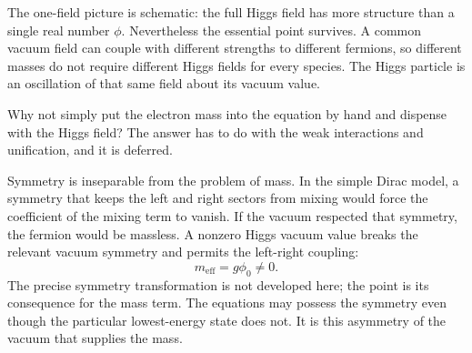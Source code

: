 \begin{classroomqa}
\end{classroomqa}

The one-field picture is schematic: the full Higgs field has more structure than a single real number \(\phi\). Nevertheless the essential point survives. A common vacuum field can couple with different strengths to different fermions, so different masses do not require different Higgs fields for every species. The Higgs particle is an oscillation of that same field about its vacuum value.

Why not simply put the electron mass into the equation by hand and dispense with the Higgs field? The answer has to do with the weak interactions and unification, and it is deferred.

\begin{classroomqa}
\end{classroomqa}

\begin{classroomqa}
\end{classroomqa}

Symmetry is inseparable from the problem of mass. In the simple Dirac model, a symmetry that keeps the left and right sectors from mixing would force the coefficient of the mixing term to vanish. If the vacuum respected that symmetry, the fermion would be massless. A nonzero Higgs vacuum value breaks the relevant vacuum symmetry and permits the left-right coupling:
\begin{equation}
m_{\mathrm{eff}}=g\phi_0\neq0.
\end{equation}
The precise symmetry transformation is not developed here; the point is its consequence for the mass term. The equations may possess the symmetry even though the particular lowest-energy state does not. It is this asymmetry of the vacuum that supplies the mass.

